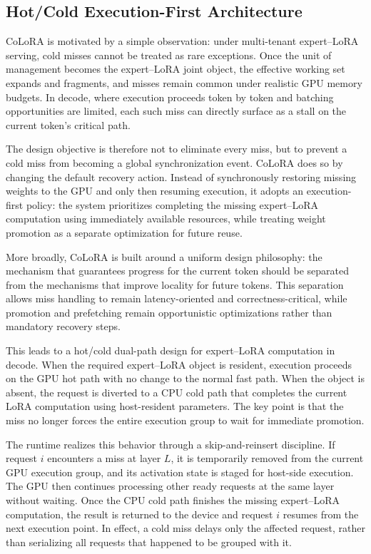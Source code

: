 \documentclass[sigplan,anonymous,review,nonacm]{acmart}
\begin{document}
\subsection{Hot/Cold Execution-First Architecture}
\label{subsec:dual-path-handling}

CoLoRA is motivated by a simple observation: under multi-tenant expert--LoRA serving, cold misses cannot be treated as rare exceptions. Once the unit of management becomes the expert--LoRA joint object, the effective working set expands and fragments, and misses remain common under realistic GPU memory budgets. In decode, where execution proceeds token by token and batching opportunities are limited, each such miss can directly surface as a stall on the current token's critical path.

The design objective is therefore not to eliminate every miss, but to prevent a cold miss from becoming a global synchronization event. CoLoRA does so by changing the default recovery action. Instead of synchronously restoring missing weights to the GPU and only then resuming execution, it adopts an execution-first policy: the system prioritizes completing the missing expert--LoRA computation using immediately available resources, while treating weight promotion as a separate optimization for future reuse.

More broadly, CoLoRA is built around a uniform design philosophy: the mechanism that guarantees progress for the current token should be separated from the mechanisms that improve locality for future tokens. This separation allows miss handling to remain latency-oriented and correctness-critical, while promotion and prefetching remain opportunistic optimizations rather than mandatory recovery steps.

This leads to a hot/cold dual-path design for expert--LoRA computation in decode. When the required expert--LoRA object is resident, execution proceeds on the GPU hot path with no change to the normal fast path. When the object is absent, the request is diverted to a CPU cold path that completes the current LoRA computation using host-resident parameters. The key point is that the miss no longer forces the entire execution group to wait for immediate promotion.

The runtime realizes this behavior through a skip-and-reinsert discipline. If request $i$ encounters a miss at layer $L$, it is temporarily removed from the current GPU execution group, and its activation state is staged for host-side execution. The GPU then continues processing other ready requests at the same layer without waiting. Once the CPU cold path finishes the missing expert--LoRA computation, the result is returned to the device and request $i$ resumes from the next execution point. In effect, a cold miss delays only the affected request, rather than serializing all requests that happened to be grouped with it.
\end{document}
